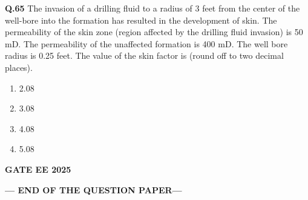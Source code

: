 \documentclass{article}
\begin{document}
\vspace{0.5cm}

\textbf{Q.65} The invasion of a drilling fluid to a radius of 3 feet from the center of the well-bore into the formation has resulted in the development of skin. The permeability of the skin zone (region affected by the drilling fluid invasion) is 50 mD. The permeability of the unaffected formation is 400 mD. The well bore radius is 0.25 feet. The value of the skin factor is \underline{\hspace{1cm}} (round off to two decimal places).
\begin{enumerate}[label=(\Alph*)]
    \item 2.08
    \item 3.08
    \item 4.08
    \item 5.08
\end{enumerate}
\textbf{GATE EE 2025}

\begin{center}
\textbf{\large --- END OF THE QUESTION PAPER---}
\end{center}
\end{document}

